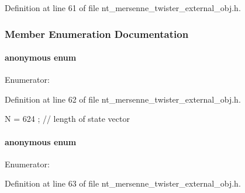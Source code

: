 Definition at line 61 of file nt\_\-mersenne\_\-twister\_\-external\_\-obj.h.



\subsubsection{Member Enumeration Documentation}
\paragraph[{"@0}]{\setlength{\rightskip}{0pt plus 5cm}anonymous enum}\hfill\label{class_m_t_rand_ab8fea37d16b55e1a0fe06149e325f1b6}
\begin{Desc}
\item[Enumerator: ]\par
\begin{description}
\item[{\em 
N\label{class_m_t_rand_ab8fea37d16b55e1a0fe06149e325f1b6a60f472facea8fabd42765cd91273db7b}
}]\end{description}
\end{Desc}



Definition at line 62 of file nt\_\-mersenne\_\-twister\_\-external\_\-obj.h.




\begin{DoxyCode}
{ N = 624 };              // length of state vector
\end{DoxyCode}


\paragraph[{"@1}]{\setlength{\rightskip}{0pt plus 5cm}anonymous enum}\hfill\label{class_m_t_rand_a7d9f4f1783a4e45f7834dd5174dfc2a1}
\begin{Desc}
\item[Enumerator: ]\par
\begin{description}
\item[{\em 
SAVE\label{class_m_t_rand_a7d9f4f1783a4e45f7834dd5174dfc2a1a3899803ea0d4da3018d311ed4902d9cc}
}]\end{description}
\end{Desc}



Definition at line 63 of file nt\_\-mersenne\_\-twister\_\-external\_\-obj.h.




